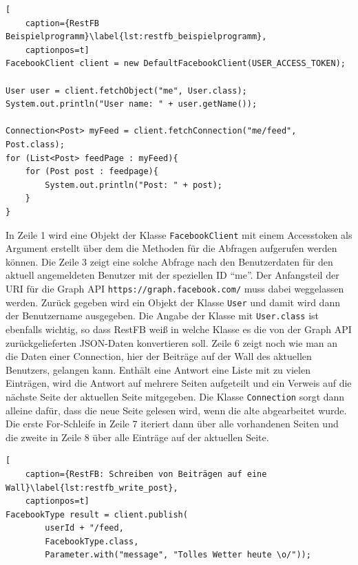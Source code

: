 \begin{lstlisting}[
    caption={RestFB Beispielprogramm}\label{lst:restfb_beispielprogramm},
    captionpos=t]
FacebookClient client = new DefaultFacebookClient(USER_ACCESS_TOKEN);

User user = client.fetchObject("me", User.class);
System.out.println("User name: " + user.getName());

Connection<Post> myFeed = client.fetchConnection("me/feed", Post.class);
for (List<Post> feedPage : myFeed){
    for (Post post : feedpage){
        System.out.println("Post: " + post);
    }
}
\end{lstlisting} 

In Zeile 1 wird eine Objekt der Klasse \texttt{FacebookClient} mit einem Accesstoken als Argument erstellt über dem die Methoden für die Abfragen aufgerufen werden können. Die Zeile 3 zeigt eine solche Abfrage nach den Benutzerdaten für den aktuell angemeldeten Benutzer mit der speziellen ID \enquote{me}. Der Anfangsteil der URI für die Graph API \texttt{https://graph.facebook.com/} muss dabei weggelassen werden. Zurück gegeben wird ein Objekt der Klasse \texttt{User} und damit wird dann der Benutzername ausgegeben. Die Angabe der Klasse mit \texttt{User.class} ist ebenfalls wichtig, so dass RestFB weiß in welche Klasse es die von der Graph API zurückgelieferten JSON-Daten konvertieren soll. Zeile 6 zeigt noch wie man an die Daten einer Connection, hier der Beiträge auf der Wall des aktuellen Benutzers, gelangen kann. Enthält eine Antwort eine Liste mit zu vielen Einträgen, wird die Antwort auf mehrere Seiten aufgeteilt und ein Verweis auf die nächste Seite der aktuellen Seite mitgegeben. Die Klasse \texttt{Connection} sorgt dann alleine dafür, dass die neue Seite gelesen wird, wenn die alte abgearbeitet wurde. Die erste For-Schleife in Zeile 7 iteriert dann über alle vorhandenen Seiten und die zweite in Zeile 8 über alle Einträge auf der aktuellen Seite.

\begin{lstlisting}[
    caption={RestFB: Schreiben von Beiträgen auf eine Wall}\label{lst:restfb_write_post},
    captionpos=t]
FacebookType result = client.publish(
        userId + "/feed,
        FacebookType.class,
        Parameter.with("message", "Tolles Wetter heute \o/"));
\end{lstlisting}

